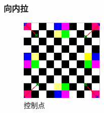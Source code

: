 \documentclass{article}
\begin{document}
		\subsubsection{向内拉}
		
			\begin{figure}[H]
			\begin{center}
				\includegraphics[width=4cm,height=4cm]{input2}
				\caption{控制点} 
			\end{center}
		\end{figure}
	
\end{document}
